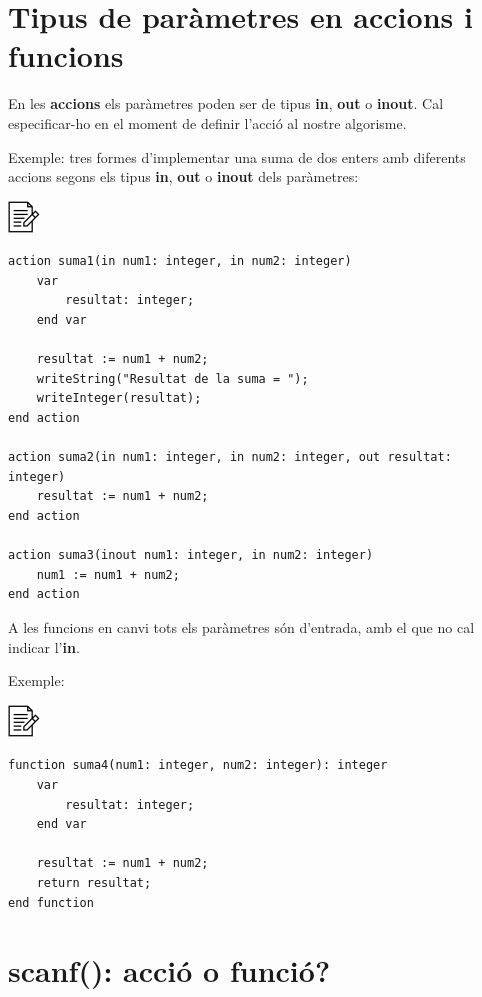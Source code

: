 \documentclass[
]{book}
\begin{document}
\hypertarget{tipus-de-paruxe0metres-en-accions-i-funcions}{%
\section{Tipus de paràmetres en accions i funcions}\label{tipus-de-paruxe0metres-en-accions-i-funcions}}

En les \textbf{accions} els paràmetres poden ser de tipus \textbf{in}, \textbf{out} o \textbf{inout}. Cal especificar-ho en el moment de definir l'acció al nostre algorisme.

Exemple: tres formes d'implementar una suma de dos enters amb diferents accions segons els tipus \textbf{in}, \textbf{out} o \textbf{inout} dels paràmetres:

\includegraphics{./img/alg.png}

\begin{verbatim}
action suma1(in num1: integer, in num2: integer)
    var
        resultat: integer;
    end var

    resultat := num1 + num2;
    writeString("Resultat de la suma = ");
    writeInteger(resultat);
end action

action suma2(in num1: integer, in num2: integer, out resultat: integer)
    resultat := num1 + num2;
end action

action suma3(inout num1: integer, in num2: integer)
    num1 := num1 + num2;
end action
\end{verbatim}

A les funcions en canvi tots els paràmetres són d'entrada, amb el que no cal indicar l'\textbf{in}.

Exemple:

\includegraphics{./img/alg.png}

\begin{verbatim}
function suma4(num1: integer, num2: integer): integer
    var
        resultat: integer;
    end var

    resultat := num1 + num2;
    return resultat;
end function
\end{verbatim}

\hypertarget{scanf-acciuxf3-o-funciuxf3}{%
\section{scanf(): acció o funció?}\label{scanf-acciuxf3-o-funciuxf3}}
\end{document}
